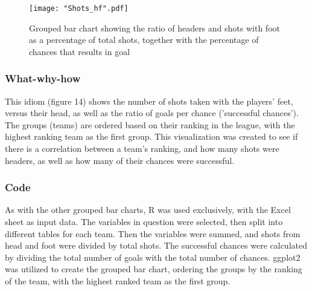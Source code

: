 \documentclass[Report.tex]{subfiles}
\begin{document}
\begin{figure}
\center
\texttt{[image: "Shots\_hf".pdf]}
\caption{Grouped bar chart showing the ratio of headers and shots with foot as
a percentage of total shots, together with the percentage of chances that
results in goal}
\label{Fig:Shots_HF} 
\end{figure}

\subsubsection{What-why-how}
This idiom (figure 14) shows the number of shots taken with the players' feet,
versus their head, as well as the ratio of goals per chance ('successful
chances'). The groups (teams) are ordered based on their ranking in the league,
with the highest ranking team as the first group. 
This visualization was created to see if
there is a correlation between a team's ranking, and how many shots were headers,
as well as how many of their chances were successful.

\subsubsection{Code}
As with the other grouped bar charts, R was used exclusively, with the Excel
sheet as input data. 
The variables in question were selected, then split into different tables for
each team. Then the variables were summed, and shots from head and foot were
divided by total shots. The successful chances were calculated by dividing the
total number of goals with the total number of chances. 
ggplot2 was utilized to create the grouped bar chart, ordering the groups by the
ranking of the team, with the highest ranked team as the first group.
\end{document}

